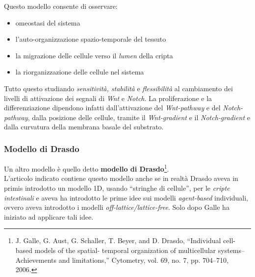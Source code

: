 \documentclass[a4paper,12pt, oneside]{book}
\begin{document}
Questo modello consente di osservare:
\begin{itemize}
  \item omeostasi del sistema
  \item l'auto-organizzazione spazio-temporale del tessuto
  \item la migrazione delle cellule verso il \textit{lumen} della cripta
  \item la riorganizzazione delle cellule nel sistema
\end{itemize}
Tutto questo studiando \textit{sensitività, stabilità} e \textit{flessibilità}
al cambiamento dei livelli di attivazione dei segnali di \textit{Wnt} e
\textit{Notch}. La proliferazione e la differenziazione dipendono infatti
dall'attivazione del \textit{Wnt-pathway} e del \textit{Notch-pathway}, dalla
posizione delle cellule, tramite il \textit{Wnt-gradient} e il
\textit{Notch-gradient} e dalla curvatura della membrana basale del substrato.
\subsubsection{Modello di Drasdo}
Un altro modello è quello detto \textbf{modello di Drasdo}\footnote{J. Galle,
  G. Aust, G. Schaller, T. Beyer, and D. 
Drasdo, “Individual cell-based models of the spatial-
temporal organization of multicellular systems--
Achievements and limitations,” Cytometry, vol. 69,
no. 7, pp. 704–710, 2006.}.\\
L'articolo indicato contiene questo modello anche se in realtà Drasdo aveva in
primis introdotto un modello 1D, usando ``stringhe di cellule'', per le
\textit{cripte intestinali} e aveva ha 
introdotto le prime idee sui modelli \textit{agent-based} individuali, ovvero
aveva introdotto i modelli \textit{off-lattice/lattice-free}. Solo dopo Galle
ha iniziato ad applicare tali idee.
\end{document}

